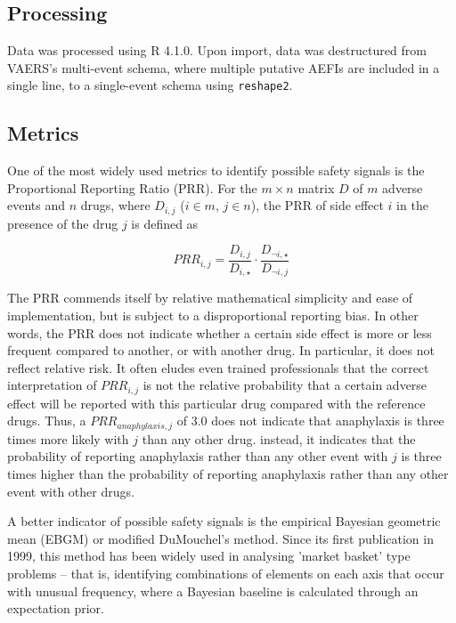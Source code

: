 \documentclass[12pt]{article}
\begin{document}
\subsection{Processing} %
\label{sub:processing}


Data was processed using R 4.1.0\cite{rstats}. Upon import, data was destructured from VAERS's multi-event schema, where multiple putative AEFIs are included in a single line, to a single-event schema using \texttt{reshape2}.\cite{wickham2012reshape2} 


\subsection{Metrics} %
\label{sub:metrics}

One of the most widely used metrics to identify possible safety signals is the Proportional Reporting Ratio (PRR).\cite{evans2001use} For the $m \times n$ matrix $D$ of $m$ adverse events and $n$ drugs, where $D_{i,j}$ ($i \in m$, $j \in n$), the PRR of side effect $i$ in the presence of the drug $j$ is defined as

$$
   PRR_{i,j} = \frac{D_{i,j}}{D_{i,\star}} \cdot \frac{D_{\neg i, \star}}{D_{\neg i, j}}
$$

The PRR commends itself by relative mathematical simplicity and ease of implementation, but is subject to a disproportional reporting bias. In other words, the PRR does not indicate whether a certain side effect is more or less frequent compared to another, or with another drug. In particular, it does not reflect relative risk. It often eludes even trained professionals that the correct interpretation of $PRR_{i,j}$ is not the relative probability that a certain adverse effect will be reported with this particular drug compared with the reference drugs. Thus, a $PRR_{anaphylaxis,j}$ of 3.0 does not indicate that anaphylaxis is three times more likely with $j$ than any other drug. instead, it indicates that the probability of reporting anaphylaxis rather than any other event with $j$ is three times higher than the probability of reporting anaphylaxis rather than any other event with other drugs.\cite{moore2003biases}

A better indicator of possible safety signals is the empirical Bayesian geometric mean (EBGM) or modified DuMouchel's method.\cite{dumouchel1999bayesian} Since its first publication in 1999, this method has been widely used in analysing 'market basket' type problems – that is, identifying combinations of elements on each axis that occur with unusual frequency, where a Bayesian baseline is calculated through an expectation prior.\cite{almenoff2003disproportionality,harpaz2013empirical,lee2020safety} 
\end{document}
